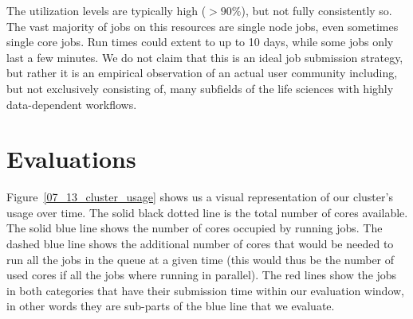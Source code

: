 \documentclass[conference,10pt]{IEEEtran}
\begin{document}
The utilization levels are typically high ($>90\%$), but
not fully consistently so. The vast majority of jobs on this resources are single node jobs, even sometimes single core jobs. Run times
could extent to up to 10 days, while some jobs only last a few minutes. We do not claim that this is an ideal job submission strategy,
but rather it is an empirical observation of an actual user community including, but not exclusively consisting of, many subfields of the life sciences with highly data-dependent workflows.

\section{Evaluations}\label{sec.evaluations}

Figure~\ref{07_13_cluster_usage} shows us a visual representation of 
our cluster's usage over time. The solid black dotted line is the total
number of cores available.
The solid blue line shows the number of cores occupied by running jobs.
The dashed blue line shows the additional number of cores that would be needed
to run all the jobs in the queue at a given time (this would thus be the number
of used cores if all the jobs where running in parallel).
The red lines show the jobs in both categories that have their submission
time within our evaluation window, in other words they are sub-parts of the blue line
that we evaluate.
\end{document}
